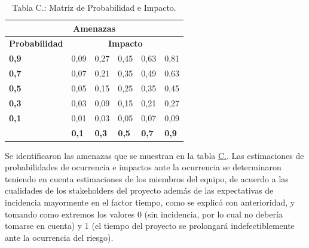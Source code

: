 \documentclass[a4paper, 12pt,twoside]{report}  %
\numberwithin{equation}{subsection} %
\begin{document}
\edef\tempTblMatProbImp{\the\value{counter_tbl_C}}%
\begin{table}[h!]
	\centering
	\begin{tabular}{
			|p{2.6cm}|p{2cm}|p{2cm}|p{2cm}|p{2cm}|p{2cm}|  }
		
		\hline
		\multicolumn{6}{|c|}{\textbf{Amenazas}} \\
		\hline
		\textbf{Probabilidad}&
		\multicolumn{5}{|c|}{\textbf{Impacto}} \\
		\hline
		\textbf{0,9}& \cellcolor{riesgo_bajo}0,09& \cellcolor{riesgo_alto}0,27& \cellcolor{riesgo_alto}0,45& \cellcolor{riesgo_alto}0,63& \cellcolor{riesgo_alto}0,81 \\
		\hline
		\textbf{0,7}& \cellcolor{riesgo_bajo}0,07& \cellcolor{riesgo_medio}0,21& \cellcolor{riesgo_alto}0,35& \cellcolor{riesgo_alto}0,49& \cellcolor{riesgo_alto}0,63 \\
		\hline
		\textbf{0,5}& \cellcolor{riesgo_bajo}0,05& \cellcolor{riesgo_medio}0,15& \cellcolor{riesgo_alto}0,25& \cellcolor{riesgo_alto}0,35& \cellcolor{riesgo_alto}0,45 \\
		\hline
		\textbf{0,3}& \cellcolor{riesgo_bajo}0,03& \cellcolor{riesgo_bajo}0,09& \cellcolor{riesgo_medio}0,15& \cellcolor{riesgo_medio}0,21& \cellcolor{riesgo_alto}0,27 \\
		\hline
		\textbf{0,1}& \cellcolor{riesgo_bajo}0,01& \cellcolor{riesgo_bajo}0,03& \cellcolor{riesgo_bajo}0,05& \cellcolor{riesgo_bajo}0,07& \cellcolor{riesgo_bajo}0,09 \\
		\hline
		\textbf{}& \textbf{0,1}& \textbf{0,3}& \textbf{0,5}& \textbf{0,7}& \textbf{0,9} \\
		\hline
	\end{tabular}
	\caption*{Tabla C.: Matriz de Probabilidad e Impacto.}
	\label{tabla_matriz_prob_impacto}
\end{table}

\indent Se identificaron las amenazas que se muestran en la tabla \hyperref[tabla_riesgos]{C.}. Las estimaciones de probabilidades de ocurrencia e impactos ante la ocurrencia se determinaron teniendo en cuenta estimaciones de los miembros del equipo, de acuerdo a las cualidades de los stakeholders del proyecto además de las expectativas de incidencia mayormente en el factor tiempo, como se explicó con anterioridad, y tomando como extremos los valores 0 (sin incidencia, por lo cual no debería tomarse en cuenta) y 1 (el tiempo del proyecto se prolongará indefectiblemente ante la ocurrencia del riesgo).\\
\end{document}
